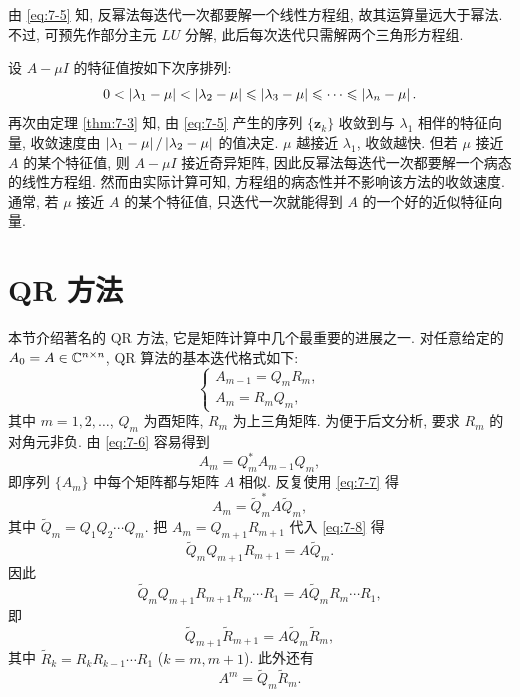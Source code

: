 由 \eqref{eq:7-5} 知, 反幂法每迭代一次都要解一个线性方程组, 故其运算量远大于幂法. 不过, 可预先作部分主元 $LU$ 分解, 此后每次迭代只需解两个三角形方程组.

设 $A-\mu I$ 的特征值按如下次序排列:
\[
  0<\left|\lambda_1-\mu\right|<\left|\lambda_2-\mu\right|\leqslant\left|\lambda_3-\mu\right|\leqslant\cdots\leqslant\left|\lambda_n-\mu\right|.
\]
再次由定理 \ref{thm:7-3} 知, 由 \eqref{eq:7-5} 产生的序列 $\{\mathbf{z}_k\}$ 收敛到与 $\lambda_1$ 相伴的特征向量, 收敛速度由 $\left|\lambda_1-\mu\right|/\left|\lambda_2-\mu\right|$ 的值决定. $\mu$ 越接近 $\lambda_1$, 收敛越快. 但若 $\mu$ 接近 $A$ 的某个特征值, 则 $A-\mu I$ 接近奇异矩阵, 因此反幂法每迭代一次都要解一个病态的线性方程组. 然而由实际计算可知, 方程组的病态性并不影响该方法的收敛速度. 通常, 若 $\mu$ 接近 $A$ 的某个特征值, 只迭代一次就能得到 $A$ 的一个好的近似特征向量.

\section{QR 方法}
\label{sec:7-4}

本节介绍著名的 QR 方法, 它是矩阵计算中几个最重要的进展之一. 对任意给定的 $A_0=A\in\mathbb{C}^{n\times n}$, QR 算法的基本迭代格式如下:
\begin{equation}
  \left\{
  \begin{array}{l}
    A_{m-1}=Q_mR_m,\\
    A_m=R_mQ_m,
  \end{array}
  \right.
  \label{eq:7-6}
\end{equation}
其中 $m=1,2,\ldots$, $Q_m$ 为酉矩阵, $R_m$ 为上三角矩阵. 为便于后文分析, 要求 $R_m$ 的对角元非负. 由 \eqref{eq:7-6} 容易得到
\begin{equation}
  A_m=Q_m^*A_{m-1}Q_m,
  \label{eq:7-7}
\end{equation}
即序列 $\{A_m\}$ 中每个矩阵都与矩阵 $A$ 相似. 反复使用 \eqref{eq:7-7} 得
\begin{equation}
  A_m=\widetilde{Q}_m^*A\widetilde{Q}_m,
  \label{eq:7-8}
\end{equation}
其中 $\widetilde{Q}_m=Q_1Q_2\cdots Q_m$. 把 $A_m=Q_{m+1}R_{m+1}$ 代入 \eqref{eq:7-8} 得
\[
  \widetilde{Q}_mQ_{m+1}R_{m+1}=A\widetilde{Q}_m.
\]
因此
\[
  \widetilde{Q}_mQ_{m+1}R_{m+1}R_m\cdots R_1=A\widetilde{Q}_mR_m\cdots R_1,
\]
即
\[
  \widetilde{Q}_{m+1}\widetilde{R}_{m+1}=A\widetilde{Q}_m\widetilde{R}_m,
\]
其中 $\widetilde{R}_k=R_kR_{k-1}\cdots R_1$ ($k=m,m+1$). 此外还有
\begin{equation}
  A^m=\widetilde{Q}_m\widetilde{R}_m.
  \label{eq:7-9}
\end{equation}

